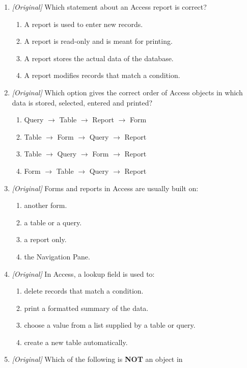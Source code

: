 \begin{enumerate}[label=\textbf{Q\arabic*.}, leftmargin=*]
\begin{enumerate}[label=\Alph*.]
  \end{enumerate}
\item \textit{[Original]} Which statement about an Access report is correct?
  \begin{enumerate}[label=\Alph*.]
    \item A report is used to enter new records.
    \item A report is read-only and is meant for printing.
    \item A report stores the actual data of the database.
    \item A report modifies records that match a condition.
  \end{enumerate}
\item \textit{[Original]} Which option gives the correct order of Access
  objects in which data is stored, selected, entered and printed?
  \begin{enumerate}[label=\Alph*.]
    \item Query $\rightarrow$ Table $\rightarrow$ Report $\rightarrow$ Form
    \item Table $\rightarrow$ Form $\rightarrow$ Query $\rightarrow$ Report
    \item Table $\rightarrow$ Query $\rightarrow$ Form $\rightarrow$ Report
    \item Form $\rightarrow$ Table $\rightarrow$ Query $\rightarrow$ Report
  \end{enumerate}
\item \textit{[Original]} Forms and reports in Access are usually built on:
  \begin{enumerate}[label=\Alph*.]
    \item another form.
    \item a table or a query.
    \item a report only.
    \item the Navigation Pane.
  \end{enumerate}
\item \textit{[Original]} In Access, a lookup field is used to:
  \begin{enumerate}[label=\Alph*.]
    \item delete records that match a condition.
    \item print a formatted summary of the data.
    \item choose a value from a list supplied by a table or query.
    \item create a new table automatically.
  \end{enumerate}
\item \textit{[Original]} Which of the following is \textbf{NOT} an object in

\end{enumerate}
